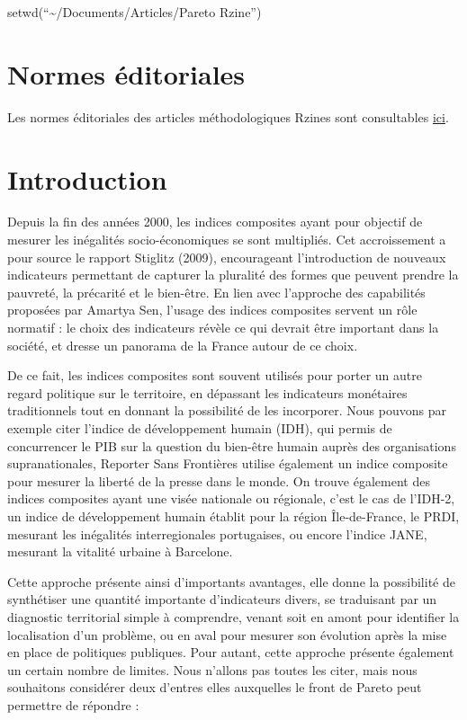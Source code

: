 \documentclass[
  french,
  11pt,
  a4paper,
]{article}
\renewcommand*\contentsname{Table des matières}
\newcommand\contentsname{Table des matières}
\begin{document}
\renewcommand*\contentsname{Table des matières}
{
\hypersetup{linkcolor=}
\setcounter{tocdepth}{3}
\tableofcontents
}
\listoffigures
\listoftables

setwd(``\textasciitilde/Documents/Articles/Pareto Rzine'')

\section{Normes éditoriales}\label{normes-uxe9ditoriales}

Les normes éditoriales des articles méthodologiques Rzines sont
consultables \href{https://rzine.fr/documentation/normes/}{ici}.

\section{Introduction}\label{introduction}

Depuis la fin des années 2000, les indices composites ayant pour
objectif de mesurer les inégalités socio-économiques se sont multipliés.
Cet accroissement a pour source le rapport Stiglitz (2009), encourageant
l'introduction de nouveaux indicateurs permettant de capturer la
pluralité des formes que peuvent prendre la pauvreté, la précarité et le
bien-être. En lien avec l'approche des capabilités proposées par Amartya
Sen, l'usage des indices composites servent un rôle normatif : le choix
des indicateurs révèle ce qui devrait être important dans la société, et
dresse un panorama de la France autour de ce choix.

De ce fait, les indices composites sont souvent utilisés pour porter un
autre regard politique sur le territoire, en dépassant les indicateurs
monétaires traditionnels tout en donnant la possibilité de les
incorporer. Nous pouvons par exemple citer l'indice de développement
humain (IDH), qui permis de concurrencer le PIB sur la question du
bien-être humain auprès des organisations supranationales, Reporter Sans
Frontières utilise également un indice composite pour mesurer la liberté
de la presse dans le monde. On trouve également des indices composites
ayant une visée nationale ou régionale, c'est le cas de l'IDH-2, un
indice de développement humain établit pour la région Île-de-France, le
PRDI, mesurant les inégalités interregionales portugaises, ou encore
l'indice JANE, mesurant la vitalité urbaine à Barcelone.

Cette approche présente ainsi d'importants avantages, elle donne la
possibilité de synthétiser une quantité importante d'indicateurs divers,
se traduisant par un diagnostic territorial simple à comprendre, venant
soit en amont pour identifier la localisation d'un problème, ou en aval
pour mesurer son évolution après la mise en place de politiques
publiques. Pour autant, cette approche présente également un certain
nombre de limites. Nous n'allons pas toutes les citer, mais nous
souhaitons considérer deux d'entres elles auxquelles le front de Pareto
peut permettre de répondre :
\end{document}
